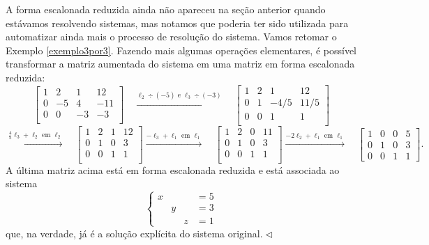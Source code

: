 \documentclass[../livro.tex]{subfiles} %
\begin{document}
\begin{remark}
A forma escalonada reduzida ainda não apareceu na seção anterior quando estávamos resolvendo sistemas, mas notamos que poderia ter sido utilizada para automatizar ainda mais o processo de resolução do sistema. Vamos retomar o Exemplo \ref{exemplo3por3}. Fazendo mais algumas operações elementares, é possível transformar a matriz aumentada do sistema em uma matriz em forma escalonada reduzida:
\begin{equation}
\left[
  \begin{array}{ccc|c}
    1 &  2 &  1 &  12 \\
    0 & -5 &  4 & -11 \\
    0 &  0 & -3 & -3 \\
  \end{array}
\right]
\quad \xrightarrow{\ell_2 \div (-5)  \text{ e } \ell_3\div (-3)} \quad
\left[
  \begin{array}{ccc|c}
    1 &  2 &  1   &  12 \\
    0 & 1  & -4/5 & 11/5 \\
    0 &  0 &  1   &  1 \\
  \end{array}
\right]
\end{equation}
\begin{equation}
\xrightarrow{\frac{4}{5}\ell_3 + \ell_2 \text{ em } \ell_2} \quad
\left[
  \begin{array}{ccc|c}
    1 &  2 &  1   &  12 \\
    0 & 1  &  0   &  3 \\
    0 &  0 &  1   &  1 \\
  \end{array}
\right]
\xrightarrow{-\ell_3 + \ell_1 \text{ em } \ell_1} \quad
\left[
  \begin{array}{ccc|c}
    1 &  2 &  0   &  11 \\
    0 &  1 &  0   &  3 \\
    0 &  0 &  1   &  1 \\
  \end{array}
\right]
\xrightarrow{-2\ell_2 + \ell_1 \text{ em } \ell_1} \quad
\left[
  \begin{array}{ccc|c}
    1 &  0 &  0   &  5 \\
    0 &  1 &  0   &  3 \\
    0 &  0 &  1   &  1
  \end{array}
\right].
\end{equation} A última matriz acima está em forma escalonada reduzida e está associada ao sistema
\begin{equation}
\left\{
  \begin{array}{llll}
    x &   &   & = 5 \\
      & y &   & = 3 \\
      &   & z & = 1
  \end{array}
\right.
\end{equation} que, na verdade, já é a solução explícita do sistema original$.\lhd$
\end{remark}
\end{document}
